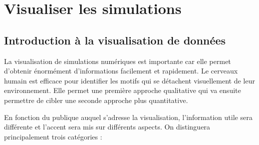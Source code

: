 \part{Visualiser les  simulations}

\chapter{Introduction à la visualisation de données}
\label{sec:visu}

La visualisation de simulations numériques est importante car elle permet d'obtenir énormément d'informations facilement et rapidement.
Le cerveaux humain est efficace pour identifier les motifs qui se détachent visuellement de leur environnement.
Elle permet une première approche qualitative qui va ensuite permettre de cibler une seconde approche plus quantitative.



En fonction du publique auquel s'adresse la visualisation, l'information utile sera différente et l'accent sera mis sur différents aspects.
On distinguera principalement trois catégories :

